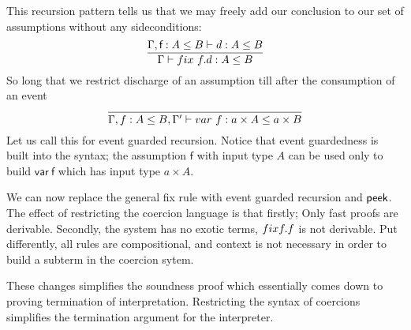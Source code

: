 \documentclass[a4paper,UKenglish,cleveref, autoref, thm-restate]{lipics-v2021}
\begin{document}
This recursion pattern tells us that we may freely add our conclusion to our set of assumptions without any sideconditions:
\[\infer{\contains{\Gamma}{\fix ~f.d}{A}{B}}{ \contains{\Gamma, \dslcom{f}: A \leq B}{d}{A}{B}}
\]
So long that we restrict discharge of an assumption till after the consumption of an event
\[\infer{\contains{\Gamma, \mathsf{f} : A \leq B, \Gamma'}{var~f}{a \times A}{a \times B}}{}
\]
Let us call this for event guarded recursion. Notice that event guardedness is built into the syntax; the assumption $\mathsf{f}$ with input type $A$ can be used only to build $\mathsf{var~f}$ which has input type $a \times A$.

We can now replace the general fix rule with event guarded recursion and $\textsf{peek}$. The effect of restricting the coercion language is that firstly; Only fast proofs are derivable. Secondly, the system has no exotic terms, $\fix f. f$ is not derivable. Put differently, all rules are compositional, and context is not necessary in order to build a subterm in the coercion sytem. 

These changes simplifies the soundness proof which essentially comes down to proving termination of interpretation. Restricting the syntax of coercions simplifies the termination argument for the interpreter. 
\end{document}
